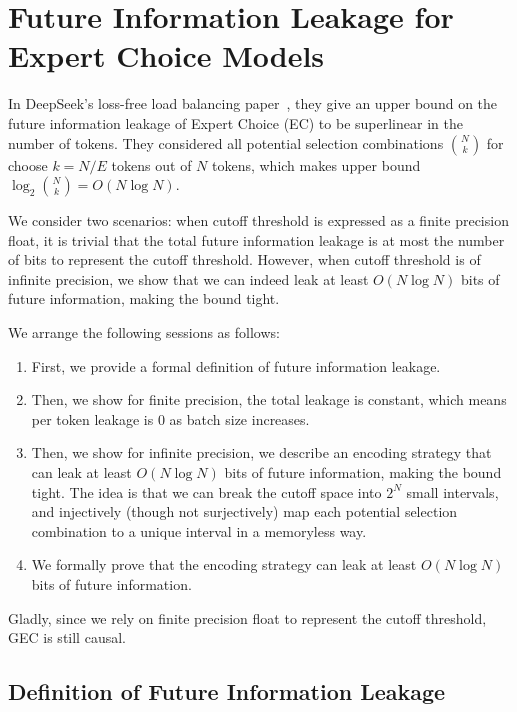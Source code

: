 \documentclass{article}
\theoremstyle{plain}
\theoremstyle{definition}
\theoremstyle{remark}
\begin{document}
\section{Future Information Leakage for Expert Choice Models}
\label{app:future_leakage_ec}

In DeepSeek's loss-free load balancing paper~\citep{wang2024auxiliarylossfreeloadbalancingstrategy}, they give an upper bound on the future information leakage of Expert Choice (EC) to be superlinear in the number of tokens. They considered all potential selection combinations $\binom{N}{k}$ for choose $k=N/E$ tokens out of $N$ tokens, which makes upper bound $\log_2\binom{N}{k} = O(N \log N)$.

We consider two scenarios: when cutoff threshold is expressed as a finite precision float, it is trivial that the total future information leakage is at most the number of bits to represent the cutoff threshold. However, when cutoff threshold is of infinite precision, we show that we can indeed leak at least $O(N \log N)$ bits of future information, making the bound tight.

We arrange the following sessions as follows:

\begin{enumerate}
    \item First, we provide a formal definition of future information leakage.
    \item Then, we show for finite precision, the total leakage is constant, which means per token leakage is 0 as batch size increases.
    \item Then, we show for infinite precision, we describe an encoding strategy that can leak at least $O(N \log N)$ bits of future information, making the bound tight. The idea is that we can break the cutoff space into $2^N$ small intervals, and injectively (though not surjectively) map each potential selection combination to a unique interval in a memoryless way. 
    \item We formally prove that the encoding strategy can leak at least $O(N \log N)$ bits of future information.
\end{enumerate}

Gladly, since we rely on finite precision float to represent the cutoff threshold, GEC is still causal. 

\subsection{Definition of Future Information Leakage}
\end{document}
